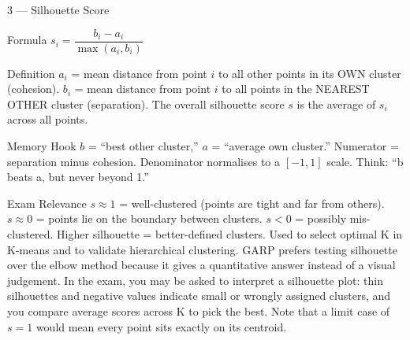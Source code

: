 \documentclass[aspectratio=169,8pt]{beamer}
\begin{document}
	\begin{frame}{3 --- Silhouette Score}
		\begin{block}{Formula}
			$s_i = \dfrac{b_i - a_i}{\max(a_i, b_i)}$
		\end{block}
		\begin{block}{Definition}
			$a_i$ = mean distance from point $i$ to all other points in its OWN cluster (cohesion). $b_i$ = mean distance from point $i$ to all points in the NEAREST OTHER cluster (separation). The overall silhouette score $s$ is the average of $s_i$ across all points.
		\end{block}
		\begin{block}{Memory Hook}
			$b$ = ``best other cluster,'' $a$ = ``average own cluster.'' Numerator = separation minus cohesion. Denominator normalises to a $[-1,1]$ scale. Think: ``b beats a, but never beyond 1.''
		\end{block}
		\begin{block}{Exam Relevance}
			$s \approx 1$ = well-clustered (points are tight and far from others). $s \approx 0$ = points lie on the boundary between clusters. $s < 0$ = possibly mis-clustered. Higher silhouette = better-defined clusters. Used to select optimal K in K-means and to validate hierarchical clustering. GARP prefers testing silhouette over the elbow method because it gives a quantitative answer instead of a visual judgement. In the exam, you may be asked to interpret a silhouette plot: thin silhouettes and negative values indicate small or wrongly assigned clusters, and you compare average scores across K to pick the best. Note that a limit case of $s = 1$ would mean every point sits exactly on its centroid.
		\end{block}
	\end{frame}
	
\end{document}

